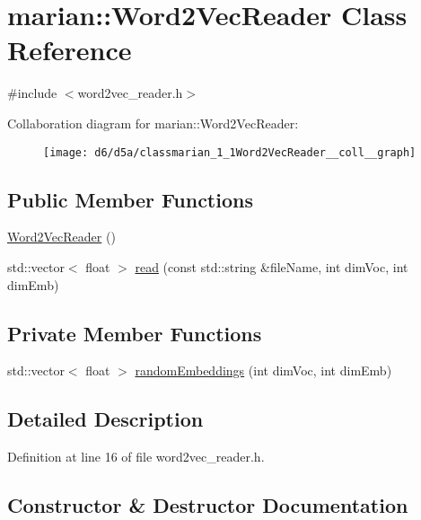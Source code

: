 \hypertarget{classmarian_1_1Word2VecReader}{}\section{marian\+:\+:Word2\+Vec\+Reader Class Reference}
\label{classmarian_1_1Word2VecReader}


{\ttfamily \#include $<$word2vec\+\_\+reader.\+h$>$}



Collaboration diagram for marian\+:\+:Word2\+Vec\+Reader\+:
\nopagebreak
\begin{figure}[H]
\begin{center}
\leavevmode
\texttt{[image: d6/d5a/classmarian\_1\_1Word2VecReader\_\_coll\_\_graph]}
\end{center}
\end{figure}
\subsection*{Public Member Functions}
\begin{DoxyCompactItemize}
\item 
\hyperlink{classmarian_1_1Word2VecReader_aef7b9914f85e9e9736fe96d254f0704b}{Word2\+Vec\+Reader} ()
\item 
std\+::vector$<$ float $>$ \hyperlink{classmarian_1_1Word2VecReader_a32bb815f947b31ad52de05042982fa93}{read} (const std\+::string \&file\+Name, int dim\+Voc, int dim\+Emb)
\end{DoxyCompactItemize}
\subsection*{Private Member Functions}
\begin{DoxyCompactItemize}
\item 
std\+::vector$<$ float $>$ \hyperlink{classmarian_1_1Word2VecReader_a4af907a4ff8a6c48d61dd9cb770ffe1b}{random\+Embeddings} (int dim\+Voc, int dim\+Emb)
\end{DoxyCompactItemize}


\subsection{Detailed Description}


Definition at line 16 of file word2vec\+\_\+reader.\+h.



\subsection{Constructor \& Destructor Documentation}
